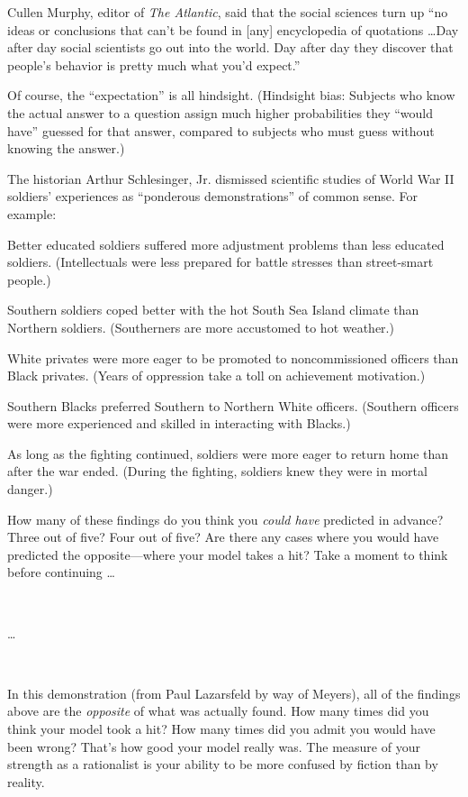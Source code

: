 {
 Cullen Murphy, editor of \textit{The Atlantic}, said that the
social sciences turn up ``no ideas or conclusions that
can't be found in [any] encyclopedia of quotations
\ldots Day after day social scientists go out into the world. Day after
day they discover that people's behavior is pretty much
what you'd expect.''}

{
 Of course, the ``expectation''
is all hindsight. (Hindsight bias: Subjects who know the actual answer
to a question assign much higher probabilities they
``would have'' guessed for that
answer, compared to subjects who must guess without knowing the
answer.)}

{
 The historian Arthur Schlesinger, Jr. dismissed scientific studies
of World War II soldiers' experiences as
``ponderous demonstrations'' of
common sense. For example:}

{
 Better educated soldiers suffered more adjustment problems than
less educated soldiers. (Intellectuals were less prepared for battle
stresses than street-smart people.)}

{
 Southern soldiers coped better with the hot South Sea Island
climate than Northern soldiers. (Southerners are more accustomed to hot
weather.)}

{
 White privates were more eager to be promoted to noncommissioned
officers than Black privates. (Years of oppression take a toll on
achievement motivation.)}

{
 Southern Blacks preferred Southern to Northern White officers.
(Southern officers were more experienced and skilled in interacting
with Blacks.)}

{
 As long as the fighting continued, soldiers were more eager to
return home than after the war ended. (During the fighting, soldiers
knew they were in mortal danger.)}

{
 How many of these findings do you think you \textit{could have}
predicted in advance? Three out of five? Four out of five? Are there
any cases where you would have predicted the opposite---where your
model takes a hit? Take a moment to think before continuing \ldots}

{
 ~}

{
 \ldots}

{
 ~}

{
 In this demonstration (from Paul Lazarsfeld by way of Meyers), all
of the findings above are the \textit{opposite} of what was actually
found. How many times did you think your model took
a hit? How many times did you admit you would have been wrong?
That's how good your model really was. The measure of
your strength as a rationalist is your ability to be more confused by
fiction than by reality.}

